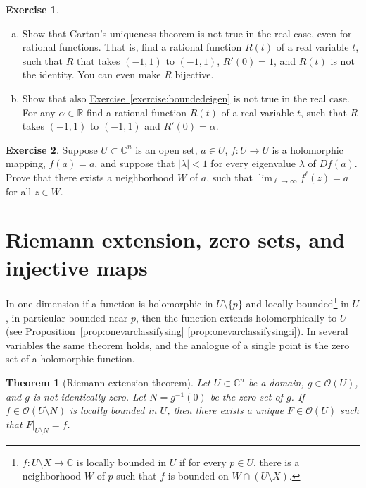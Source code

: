\documentclass[12pt,openany]{book}
\newcommand{\sabs}[1]{\lvert {#1} \rvert}
\newcommand{\C}{{\mathbb{C}}}
\newcommand{\R}{{\mathbb{R}}}
\newcommand{\sO}{{\mathscr{O}}}
\newcommand{\myindex}[1]{#1\index{#1}}
\theoremstyle{plain}
\newtheorem{thm}{Theorem}[section]
\theoremstyle{remark}
\theoremstyle{definition}
\newenvironment{exbox}{%
    \def\FrameCommand{\vrule width 1pt \relax\hspace{10pt}}%
    \MakeFramed{\advance\hsize-\width\FrameRestore}%
}{%
    \endMakeFramed
}
\newenvironment{exparts}{%
    \leavevmode\begin{enumerate}[a),noitemsep,topsep=0pt,parsep=0pt,partopsep=0pt]
}{%
    \end{enumerate}
}
\theoremstyle{exercise}
\newtheorem{exercise}{Exercise}[section]
\theoremstyle{example}
\newcommand{\exerciseref}[1]{\hyperref[#1]{Exercise~\ref*{#1}}}
\newcommand{\propref}[1]{\hyperref[#1]{Proposition~\ref*{#1}}}
\begin{document}
\begin{exbox}
\begin{exercise}
\begin{exparts}
\item
Show that Cartan's uniqueness theorem is not true in the real case,
even for rational
functions.  That is, find a rational function $R(t)$ of
a real variable $t$, such that $R$ that takes $(-1,1)$ to
$(-1,1)$, $R'(0) = 1$, and $R(t)$ is not the identity.  You can even make
$R$ bijective.
\item
Show that also \exerciseref{exercise:boundedeigen} is not true in the real
case.
For any $\alpha \in \R$ find a rational function $R(t)$ of
a real variable $t$, such that $R$ takes $(-1,1)$ to $(-1,1)$ and
$R'(0) = \alpha$.
\end{exparts}
\end{exercise}

\begin{exercise}
Suppose $U \subset \C^n$ is an open set, $a \in U$,
$f \colon U \to U$ is a holomorphic mapping,
$f(a) = a$, and suppose that $\sabs{\lambda} < 1$
for every eigenvalue $\lambda$ of
$D f(a)$.  Prove that there exists a neighborhood $W$ of $a$, such that
$\lim_{\ell \to \infty} f^{\ell}(z) = a$ for all $z \in W$.
\end{exercise}
\end{exbox}


\section{Riemann extension, zero sets, and injective maps}
\label{sec:riemannextzerosetsinjmaps}

In one dimension if a function is holomorphic in $U
\setminus \{ p \}$ and
locally bounded\footnote{%
$f \colon U \setminus X \to \C$ is locally bounded in $U$
if for every $p \in U$, there is a neighborhood $W$ of
$p$ such that $f$ is bounded on $W \cap (U \setminus X)$.}
in $U$, in particular bounded near
$p$, then the function extends holomorphically to $U$ (see
\propref{prop:onevarclassifysing} \ref{prop:onevarclassifysing:i}).  In several
variables the same theorem holds, and the analogue of a single point
is the zero set of a holomorphic function.

\begin{thm}[\myindex{Riemann extension theorem}]
Let $U \subset \C^n$ be a domain,  $g \in \sO(U)$, and $g$ is not
identically zero.  Let
$N = g^{-1}(0)$ be the zero set of $g$.
If 
$f \in \sO(U \setminus N)$
is locally bounded in $U$,
then there exists a unique $F \in \sO(U)$ such that $F|_{U \setminus N} = f$.
\end{thm}
\end{document}
